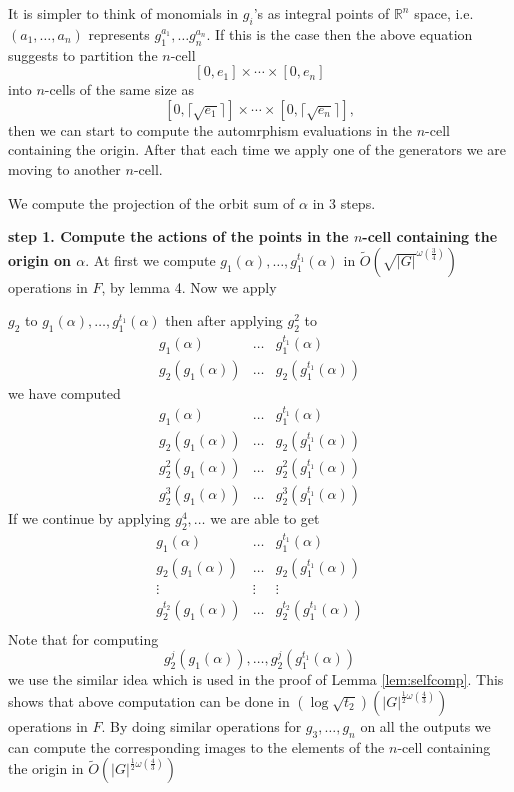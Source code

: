 It is simpler to think of monomials in $g_i$'s as integral points of $\mathbb{R}^n$ space, i.e.
$(a_1, \ldots , a_n)$ represents $g_1^{a_1}, \ldots g_n^{a_n}$. If this is the case then the above equation suggests to 
partition the $n$-cell $$[0,e_1] \times \cdots \times [0, e_n]$$ into $n$-cells of the same size as 
$$[0,\lceil \sqrt{e_1} \rceil] \times \cdots \times [0, \lceil \sqrt{e_n} \rceil],$$ 
then we can start to compute the automrphism evaluations in the $n$-cell containing the origin. After that each time we apply one 
of the generators we are moving to another $n$-cell.

We compute the projection of the orbit sum of $\alpha$ in 3 steps.

\textbf{step 1. Compute the actions of the points in the $n$-cell containing the origin on $\alpha$}. At first we compute 
$g_1(\alpha), \ldots , g_1^{t_1}(\alpha)$ in $\tilde{O}(\sqrt{\vert G \vert}^{\omega({\frac{3}{4}})})$ operations in $F$, by lemma 4. Now
we apply 

 $g_2$ to $g_1(\alpha), \ldots , g_1^{t_1}(\alpha)$ then after applying $g_2^2$ to
\[
 \begin{array}{lll}
 g_1(\alpha)& \ldots & g_1^{t_1}(\alpha)\\
 g_2(g_1(\alpha))& \ldots & g_2(g_1^{t_1}(\alpha)) 
\end{array} 
\]
we have computed
\[
 \begin{array}{lll}
 g_1(\alpha)& \ldots & g_1^{t_1}(\alpha)\\
 g_2(g_1(\alpha))& \ldots & g_2(g_1^{t_1}(\alpha)) \\
 g_2^2(g_1(\alpha))& \ldots & g_2^2(g_1^{t_1}(\alpha)) \\
 g_2^3(g_1(\alpha))& \ldots & g_2^3(g_1^{t_1}(\alpha))
\end{array} 
\]
If we continue by applying $g_2^4, \ldots$ we are able to get
\[
 \begin{array}{lll}
 g_1(\alpha)& \ldots & g_1^{t_1}(\alpha)\\
 g_2(g_1(\alpha))& \ldots & g_2(g_1^{t_1}(\alpha)) \\
 \vdots & \vdots & \vdots\\
 g_2^{t_2}(g_1(\alpha))& \ldots & g_2^{t_2}(g_1^{t_1}(\alpha)) \\
\end{array} 
\]
Note that for computing 
$$g_2^{j}(g_1(\alpha)), \ldots , g_2^{j}(g_1^{t_1}(\alpha))$$
we use the similar idea which is used in the proof of Lemma \ref{lem:selfcomp}.
This shows that above computation can be done in $(\log \sqrt{t_2})(\vert G \vert ^{\frac{1}{2}\omega(\frac{4}{3})})$ operations in $F$. By doing similar operations for $g_3, \ldots, g_n$ on all the outputs we can compute the corresponding images to the elements
of the $n$-cell containing the origin in $\tilde{O}(\vert G \vert ^{\frac{1}{2}\omega(\frac{4}{3})})$

